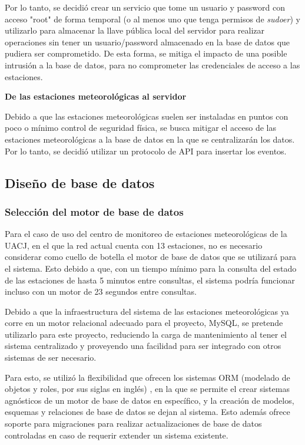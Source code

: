 Por lo tanto, se decidió crear un servicio que tome un usuario y password con acceso "root" de forma temporal (o al menos uno que tenga permisos de \emph{sudoer}) y utilizarlo para almacenar la llave pública local del servidor para realizar operaciones sin tener un usuario/password almacenado en la base de datos que pudiera ser comprometido. De esta forma, se mitiga el impacto de una posible intrusión a la base de datos, para no comprometer las credenciales de acceso a las estaciones.

\textbf{De las estaciones meteorológicas al servidor}

Debido a que las estaciones meteorológicas suelen ser instaladas en puntos con poco o mínimo control de seguridad física, se busca mitigar el acceso de las estaciones meteorológicas a la base de datos en la que se centralizarán los datos. Por lo tanto, se decidió utilizar un protocolo de API para insertar los eventos.

\subsection{Diseño de base de datos}





\subsubsection{Selección del motor de base de datos}

Para el caso de uso del centro de monitoreo de estaciones meteorológicas de la UACJ, en el que la red actual cuenta con 13 estaciones, no es necesario considerar como cuello de botella el motor de base de datos que se utilizará para el sistema. Esto debido a que, con un tiempo mínimo para la consulta del estado de las estaciones de hasta 5 minutos entre consultas, el sistema podría funcionar incluso con un motor de 23 segundos entre consultas.

Debido a que la infraestructura del sistema de las estaciones meteorológicas ya corre en un motor relacional adecuado para el proyecto, MySQL, se pretende utilizarlo para este proyecto, reduciendo la carga de mantenimiento al tener el sistema centralizado y proveyendo una facilidad para ser integrado con otros sistemas de ser necesario.

Para esto, se utilizó la flexibilidad que ofrecen los sistemas ORM (modelado de objetos y roles, por sus siglas en inglés) \cite{Halpin2006}, en la que se permite el crear sistemas agnósticos de un motor de base de datos en específico, y la creación de modelos, esquemas y relaciones de base de datos se dejan al sistema. Esto además ofrece soporte para migraciones para realizar actualizaciones de base de datos controladas en caso de requerir extender un sistema existente.



